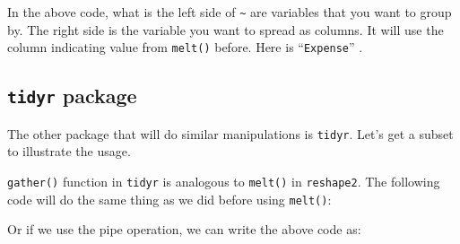 \documentclass[12pt,]{krantz}
\makeatletter
\newenvironment{Shaded}{\begin{snugshade}}{\end{snugshade}}
\newcommand{\KeywordTok}[1]{\textcolor[rgb]{0.27,0.27,0.27}{\textbf{#1}}}
\newcommand{\DecValTok}[1]{\textcolor[rgb]{0.06,0.06,0.06}{#1}}
\newcommand{\StringTok}[1]{\textcolor[rgb]{0.5,0.5,0.5}{#1}}
\newcommand{\CommentTok}[1]{\textcolor[rgb]{0.37,0.37,0.37}{\textit{#1}}}
\newcommand{\OperatorTok}[1]{\textcolor[rgb]{0.43,0.43,0.43}{\textbf{#1}}}
\newcommand{\NormalTok}[1]{#1}
\newenvironment{kframe}{%
\medskip{}
\setlength{\fboxsep}{.8em}
 \def\at@end@of@kframe{}%
 \ifinner\ifhmode%
  \def\at@end@of@kframe{\end{minipage}}%
  \begin{minipage}{\columnwidth}%
 \fi\fi%
 \def\FrameCommand##1{\hskip\@totalleftmargin \hskip-\fboxsep
 \colorbox{shadecolor}{##1}\hskip-\fboxsep
     \hskip-\linewidth \hskip-\@totalleftmargin \hskip\columnwidth}%
 \MakeFramed {\advance\hsize-\width
   \@totalleftmargin\z@ \linewidth\hsize
   \@setminipage}}%
 {\par\unskip\endMakeFramed%
 \at@end@of@kframe}
\renewenvironment{Shaded}{\begin{kframe}}{\end{kframe}}
\theoremstyle{definition}
\theoremstyle{definition}
\theoremstyle{definition}
\theoremstyle{remark}
\makeatother
\begin{document}
In the above code, what is the left side of \texttt{\textasciitilde{}}
are variables that you want to group by. The right side is the variable
you want to spread as columns. It will use the column indicating value
from \texttt{melt()} before. Here is ``\texttt{Expense}'' .

\subsection{\texorpdfstring{\texttt{tidyr}
package}{tidyr package}}\label{tidyr-package}

The other package that will do similar manipulations is \texttt{tidyr}.
Let's get a subset to illustrate the usage.

\begin{Shaded}
\end{Shaded}

\texttt{gather()} function in \texttt{tidyr} is analogous to
\texttt{melt()} in \texttt{reshape2}. The following code will do the
same thing as we did before using \texttt{melt()}:

\begin{Shaded}
\end{Shaded}

Or if we use the pipe operation, we can write the above code as:

\begin{Shaded}
\end{Shaded}
\end{document}

